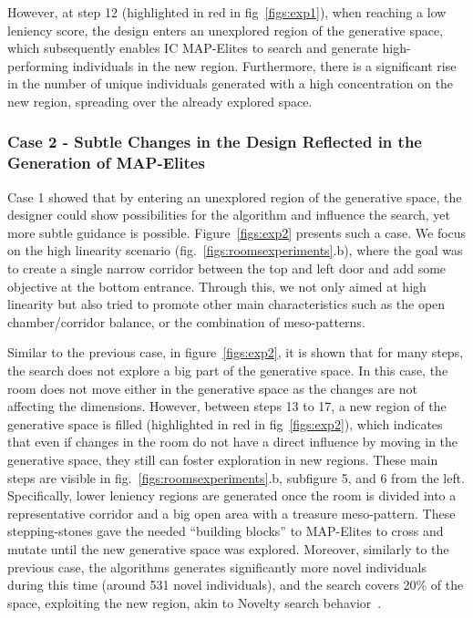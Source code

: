 However, at step 12 (highlighted in red in fig~\ref{figs:exp1}), when reaching a low leniency score, the design enters an unexplored region of the generative space, which subsequently enables IC MAP-Elites to search and generate high-performing individuals in the new region. Furthermore, there is a significant rise in the number of unique individuals generated with a high concentration on the new region, spreading over the already explored space.

\subsubsection{Case 2 - Subtle Changes in the Design Reflected in the Generation of MAP-Elites} \label{sec:case2}

Case 1 showed that by entering an unexplored region of the generative space, the designer could show possibilities for the algorithm and influence the search, yet more subtle guidance is possible. Figure~\ref{figs:exp2} presents such a case. We focus on the high linearity scenario (fig.~\ref{figs:roomsexperiments}.b), where the goal was to create a single narrow corridor between the top and left door and add some objective at the bottom entrance. Through this, we not only aimed at high linearity but also tried to promote other main characteristics such as the open chamber/corridor balance, or the combination of meso-patterns.

Similar to the previous case, in figure~\ref{figs:exp2}, it is shown that for many steps, the search does not explore a big part of the generative space. In this case, the room does not move either in the generative space as the changes are not affecting the dimensions. However, between steps 13 to 17, a new region of the generative space is filled (highlighted in red in fig~\ref{figs:exp2}), which indicates that even if changes in the room do not have a direct influence by moving in the generative space, they still can foster exploration in new regions. These main steps are visible in fig.~\ref{figs:roomsexperiments}.b, subfigure 5, and 6 from the left. Specifically, lower leniency regions are generated once the room is divided into a representative corridor and a big open area with a treasure meso-pattern. These stepping-stones gave the needed “building blocks” to MAP-Elites to cross and mutate until the new generative space was explored. Moreover, similarly to the previous case, the algorithms generates significantly more novel individuals during this time  (around 531 novel individuals), and the search covers 20\% of the space, exploiting the new region, akin to Novelty search behavior~\cite{p9liapis2015-ConstrainedNoveltySearch}.

